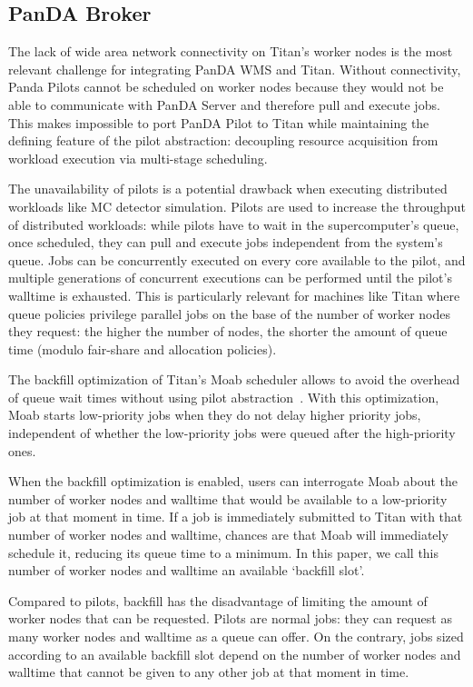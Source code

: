 \subsection{PanDA Broker}
\label{ssec:panda_titan}

The lack of wide area network connectivity on Titan's worker nodes is the
most relevant challenge for integrating PanDA WMS and Titan. Without
connectivity, Panda Pilots cannot be scheduled on worker nodes because they
would not be able to communicate with PanDA Server and therefore pull and
execute jobs. This makes impossible to port PanDA Pilot to Titan while
maintaining the defining feature of the pilot abstraction: decoupling
resource acquisition from workload execution via multi-stage scheduling.

The unavailability of pilots is a potential drawback when executing
distributed workloads like MC detector simulation. Pilots are used to
increase the throughput of distributed workloads: while pilots have to wait
in the supercomputer's queue, once scheduled, they can pull and execute jobs
independent from the system's queue. Jobs can be concurrently executed on
every core available to the pilot, and multiple generations of concurrent
executions can be performed until the pilot's walltime is exhausted. This is
particularly relevant for machines like Titan where queue policies privilege
parallel jobs on the base of the number of worker nodes they request: the
higher the number of nodes, the shorter the amount of queue time (modulo
fair-share and allocation policies).

The backfill optimization of Titan's Moab scheduler allows to avoid the
overhead of queue wait times without using pilot
abstraction~\cite{maui_backfill_url}. With this optimization, Moab starts
low-priority jobs when they do not delay higher priority jobs, independent of
whether the low-priority jobs were queued after the high-priority ones.

When the backfill optimization is enabled, users can interrogate Moab about
the number of worker nodes and walltime that would be available to a
low-priority job at that moment in time. If a job is immediately submitted to
Titan with that number of worker nodes and walltime, chances are that Moab
will immediately schedule it, reducing its queue time to a minimum. In this
paper, we call this number of worker nodes and walltime an available
`backfill slot'.

Compared to pilots, backfill has the disadvantage of limiting the amount of
worker nodes that can be requested. Pilots are normal jobs: they can request
as many worker nodes and walltime as a queue can offer. On the contrary, jobs
sized according to an available backfill slot depend on the number of worker
nodes and walltime that cannot be given to any other job at that moment in
time.

